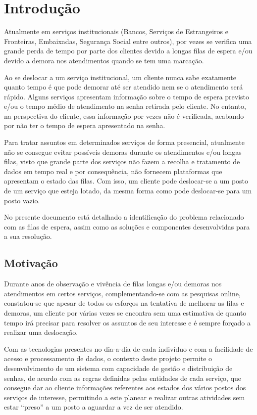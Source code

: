 
\chapter{Introdução}
\label{cha:introduction}

Atualmente em serviços institucionais (Bancos, Serviços de Estrangeiros e Fronteiras, Embaixadas, Segurança Social entre outros), por vezes se verifica uma grande perda de tempo por parte dos clientes devido a longas filas de espera e/ou devido a demora nos atendimentos quando se tem uma marcação.

Ao se deslocar a um serviço institucional, um cliente nunca sabe exatamente quanto tempo é que pode demorar até ser atendido nem se o atendimento será rápido. Alguns serviços apresentam informação sobre o tempo de espera previsto e/ou o tempo médio de atendimento na senha retirada pelo cliente. No entanto, na perspectiva do cliente, essa informação por vezes não é verificada, acabando por não ter o tempo de espera apresentado na senha. 

Para tratar assuntos em determinados serviços de forma presencial, atualmente não se consegue evitar possíveis demoras durante os atendimentos e/ou longas filas, visto que grande parte dos serviços não fazem a recolha e tratamento de dados em tempo real e por consequência, não fornecem plataformas que apresentam o estado das filas. Com isso, um cliente pode deslocar-se a um posto de um serviço que esteja lotado, da mesma forma como pode deslocar-se para um posto vazio.

No presente documento está detalhado a identificação do problema relacionado com as filas de espera, assim como as soluções e componentes desenvolvidas para a sua resolução.

\section{Motivação} 
\label{sec:introduction}

Durante anos de observação e vivência de filas longas e/ou demoras nos atendimentos em certos serviços, complementando-se com as pesquisas online, constatou-se que apesar de todos os esforços na tentativa de melhorar as filas e demoras, um cliente por várias vezes se encontra sem uma estimativa de quanto tempo irá precisar para resolver os assuntos de seu interesse e é sempre forçado a realizar uma deslocação.

Com as tecnologias presentes no dia-a-dia de cada indivíduo e com a facilidade de acesso e processamento de dados, o contexto deste projeto permite o desenvolvimento de um sistema com capacidade de gestão e distribuição de senhas, de acordo com as regras definidas pelas entidades de cada serviço, que consegue dar ao cliente informações referentes aos estados dos vários postos dos serviços de interesse, permitindo a este planear e realizar outras atividades sem estar “preso” a um posto a aguardar a vez de ser atendido.


